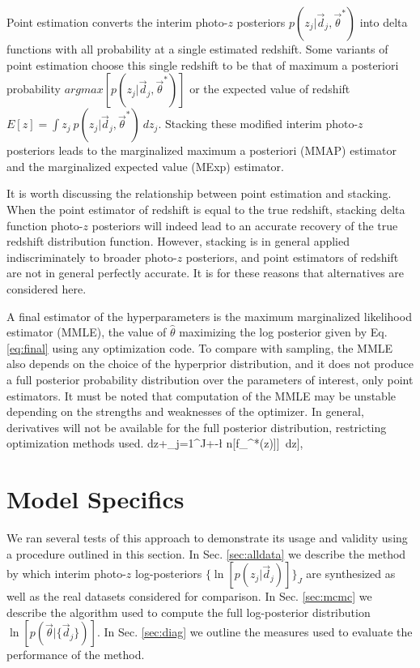 \documentclass[preprint]{aastex}
\begin{document}
Point estimation converts the interim photo-$z$ posteriors 
$p(z_{j}|\vec{d}_{j},\vec{\theta}^{*})$ into delta functions with all 
probability at a single estimated redshift.  Some variants of point estimation 
choose this single redshift to be that of maximum a posteriori probability 
$argmax[p(z_{j}|\vec{d}_{j},\vec{\theta}^{*})]$ or the expected value of 
redshift $E[z]=\int z_{j}\ p(z_{j}|\vec{d}_{j},\vec{\theta}^{*})\ dz_{j}$.  
Stacking these modified interim photo-$z$ posteriors leads to the marginalized 
maximum a posteriori (MMAP) estimator and the marginalized expected value 
(MExp) estimator.

It is worth discussing the relationship between point estimation and stacking.  
When the point estimator of redshift is equal to the true redshift, stacking 
delta function photo-$z$ posteriors will indeed lead to an accurate recovery of 
the true redshift distribution function.  However, stacking is in general 
applied indiscriminately to broader photo-$z$ posteriors, and point estimators 
of redshift are not in general perfectly accurate.  It is for these reasons 
that alternatives are considered here.

A final estimator of the hyperparameters is the maximum marginalized likelihood 
estimator (MMLE), the value of $\hat{\theta}$ maximizing the log posterior 
given by Eq. \ref{eq:final} using any optimization code.  To compare with 
sampling, the MMLE also depends on the choice of the hyperprior distribution, 
and it does not produce a full posterior probability distribution over the 
parameters of interest, only point estimators.  It must be noted that 
computation of the MMLE may be unstable depending on the strengths and 
weaknesses of the optimizer.  In general, derivatives will not be available for 
the full posterior distribution, restricting optimization methods used.
dz+\sum_{j=1}^{J}\ln\left[\int\ 
\exp\left[\ln[p(z_{j}|\vec{d}_{j},\vec{\theta}^{*})]+-\l
n[f_{\vec{\theta}^{*}}(z)]\right]\ dz\right],

\section{Model Specifics}
\label{sec:exp}

We ran several tests of this approach to demonstrate its usage and validity 
using a procedure outlined in this section.  In Sec. \ref{sec:alldata} we 
describe the method by which interim photo-$z$ log-posteriors 
$\{\ln[p(z_{j}|\vec{d}_{j})]\}_{J}$ are synthesized as well as the real 
datasets considered for comparison.  In Sec. \ref{sec:mcmc} we describe the 
algorithm used to compute the full log-posterior distribution 
$\ln[p(\vec{\theta}|\{\vec{d}_{j}\})]$.  In Sec. \ref{sec:diag} we outline the 
measures used to evaluate the performance of the method.
\end{document}
